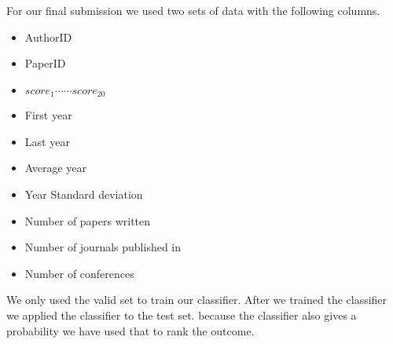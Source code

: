 For our final submission we used two sets of data with the following columns.

\begin{itemize}
\item [] AuthorID 
\item [] PaperID 
\item [] $score_1 \cdots \cdots score_{20}$ 
\item [] First year 
\item [] Last year 
\item [] Average year 
\item [] Year Standard deviation 
\item [] Number of papers written
\item [] Number of journals published in 
\item [] Number of conferences
\end{itemize}

We only used the valid set to train our classifier. After we trained the classifier we applied the classifier to the test set. because the classifier also gives a probability we have used that to rank the outcome.




